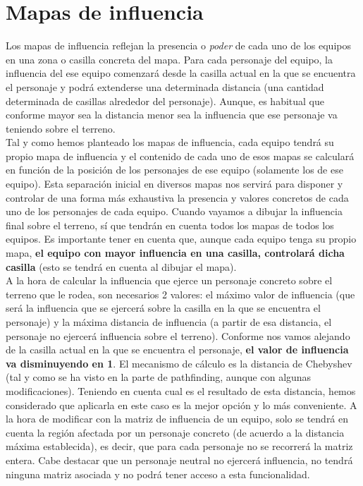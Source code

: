 \medskip
\section{Mapas de influencia}

Los mapas de influencia reflejan la presencia o \textit{poder} de cada uno de los equipos en una zona o casilla concreta del mapa. Para cada personaje del equipo, la influencia del ese equipo comenzará desde la casilla actual en la que se encuentra el personaje y podrá extenderse una determinada distancia (una cantidad determinada de casillas alrededor del personaje). Aunque, es habitual que conforme mayor sea la distancia menor sea la influencia que ese personaje va teniendo sobre el terreno. \\

Tal y como hemos planteado los mapas de influencia, cada equipo tendrá su propio mapa de influencia y el contenido de cada uno de esos mapas se calculará en función de la posición de los personajes de ese equipo (solamente los de ese equipo). Esta separación inicial en diversos mapas nos servirá para disponer y controlar de una forma más exhaustiva la presencia y valores concretos de cada uno de los personajes de cada equipo. Cuando vayamos a dibujar la influencia final sobre el terreno, sí que tendrán en cuenta todos los mapas de todos los equipos. Es importante tener en cuenta que, aunque cada equipo tenga su propio mapa, \textbf{el equipo con mayor influencia en una casilla, controlará dicha casilla} (esto se tendrá en cuenta al dibujar el mapa). \\

A la hora de calcular la influencia que ejerce un personaje concreto sobre el terreno que le rodea, son necesarios 2 valores: el máximo valor de influencia (que será la influencia que se ejercerá sobre la casilla en la que se encuentra el personaje) y la máxima distancia de influencia (a partir de esa distancia, el personaje no ejercerá influencia sobre el terreno). Conforme nos vamos alejando de la casilla actual en la que se encuentra el personaje, \textbf{el valor de influencia va disminuyendo en 1}. El mecanismo de cálculo es la distancia de Chebyshev (tal y como se ha visto en la parte de pathfinding, aunque con algunas modificaciones). Teniendo en cuenta cual es el resultado de esta distancia, hemos considerado que aplicarla en este caso es la mejor opción y lo más conveniente. A la hora de modificar con la matriz de influencia de un equipo, solo se tendrá en cuenta la región afectada por un personaje concreto (de acuerdo a la distancia máxima establecida), es decir, que para cada personaje no se recorrerá la matriz entera. Cabe destacar que un personaje neutral no ejercerá influencia, no tendrá ninguna matriz asociada y no podrá tener acceso a esta funcionalidad. \\

